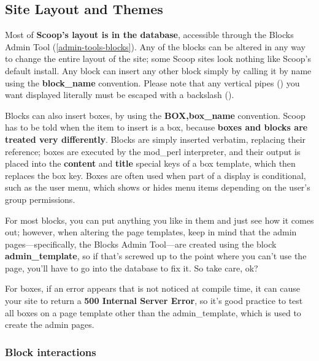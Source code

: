 \subsection{Site Layout and Themes}
\label{features-custom}

Most of {\bf Scoop's layout is in the database}, accessible through the Blocks Admin Tool (\ref{admin-tools-blocks}).  Any of the blocks can be altered in any way to change the entire layout of the site; some Scoop sites look nothing like Scoop's default install.  Any block can insert any other block simply by calling it by name using the {\bf \latexhtml{$\vert$}{|}block\_name\latexhtml{$\vert$}{|}} convention.  Please note that any vertical pipes (\latexhtml{$\vert$}{|}) you want displayed literally must be escaped with a backslash (\latexhtml{$\backslash$$\vert$}{\\|}).

Blocks can also insert boxes, by using the {\bf \latexhtml{$\vert$}{|}BOX,box\_name\latexhtml{$\vert$}{|}} convention.  Scoop has to be told when the item to insert is a box, because {\bf boxes and blocks are treated very differently}.  Blocks are simply inserted verbatim, replacing their reference; boxes are executed by the mod\_perl interpreter, and their output is placed into the {\bf content} and {\bf title} special keys of a box template, which then replaces the box key.  Boxes are often used when part of a display is conditional, such as the user menu, which shows or hides menu items depending on the user's group permissions.

For most blocks, you can put anything you like in them and just see how it comes out; however, when altering the page templates, keep in mind that the admin pages---specifically, the Blocks Admin Tool---are created using the block {\bf admin\_template}, so if that's screwed up to the point where you can't use the page, you'll have to go into the database to fix it.  So take care, ok?

For boxes, if an error appears that is not noticed at compile time, it can cause your site to return a {\bf 500 Internal Server Error}, so it's good practice to test all boxes on a page template other than the admin\_template, which is used to create the admin pages.

\subsubsection{Block interactions}
\label{blocks-interactions}

